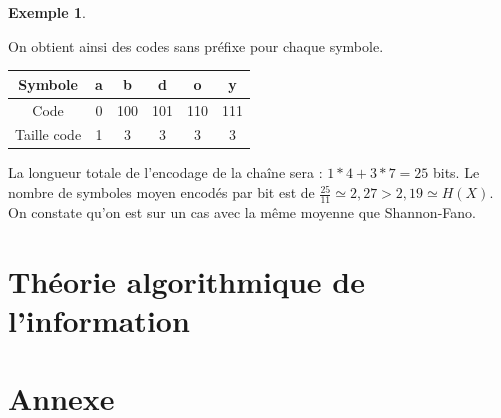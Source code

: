 \documentclass[10pt,a4paper]{article}
\theoremstyle{definition}
\newtheorem{example}{Exemple}
\numberwithin{lemma}{subsection}
\numberwithin{theorem}{subsection}
\numberwithin{definition}{subsection}
\numberwithin{proposition}{subsection}
\numberwithin{corollary}{subsection}
\numberwithin{property}{subsection}
\numberwithin{example}{subsection}
\numberwithin{heuristique}{subsection}
\numberwithin{scenario}{subsection}
\begin{document}
\begin{example}
\begin{itemize}
\begin{center}
\end{center}
\end{itemize}
On obtient ainsi des codes sans préfixe pour chaque symbole.
\par\begin{tabular}{|c|c|c|c|c|c|}
\hline
Symbole & a & b & d & o & y \\
\hline
Code & 0 & 100 & 101 & 110 & 111 \\
\hline
Taille code & 1 & 3 & 3 & 3 & 3 \\
\hline
\end{tabular}
\par La longueur totale de l'encodage de la chaîne sera : $1*4 + 3*7 = 25$ bits. Le nombre de symboles moyen encodés par bit est de $\frac{25}{11} \simeq 2,27 > 2,19 \simeq H(X)$. On constate qu'on est sur un cas avec la même moyenne que Shannon-Fano.
\end{example}


        
        
        

\section{Théorie algorithmique de l'information}
	
	
\section*{Annexe}
\end{document}
